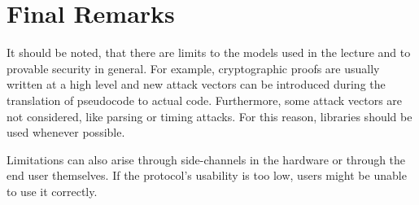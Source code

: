 \section{Final Remarks}
It should be noted, that there are limits to the models used in the lecture and to provable security in general.
For example, cryptographic proofs are usually written at a high level and new attack vectors can be introduced during the translation of pseudocode to actual code.
Furthermore, some attack vectors are not considered, like parsing or timing attacks.
For this reason, libraries should be used whenever possible.

Limitations can also arise through side-channels in the hardware or through the end user themselves.
If the protocol's usability is too low, users might be unable to use it correctly.
